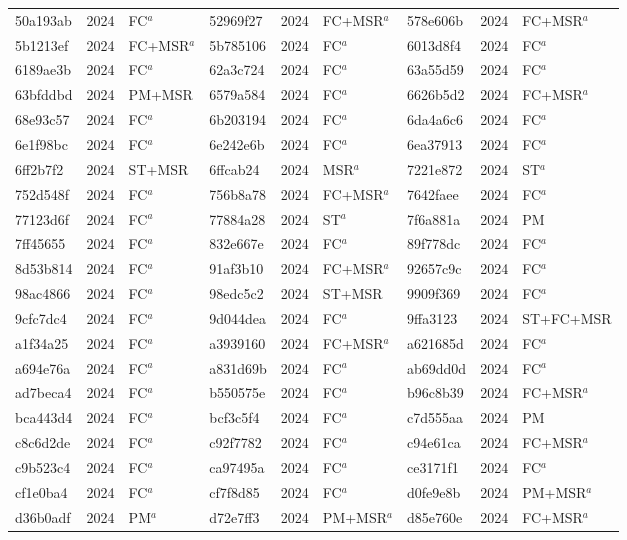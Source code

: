 \begin{longtable}{lll@{\hspace{10pt}}lll@{\hspace{10pt}}lll}
50a193ab & 2024 & FC$^{a}$ & 52969f27 & 2024 & FC+MSR$^{a}$ & 578e606b & 2024 & FC+MSR$^{a}$ \\
5b1213ef & 2024 & FC+MSR$^{a}$ & 5b785106 & 2024 & FC$^{a}$ & 6013d8f4 & 2024 & FC$^{a}$ \\
6189ae3b & 2024 & FC$^{a}$ & 62a3c724 & 2024 & FC$^{a}$ & 63a55d59 & 2024 & FC$^{a}$ \\
63bfddbd & 2024 & PM+MSR & 6579a584 & 2024 & FC$^{a}$ & 6626b5d2 & 2024 & FC+MSR$^{a}$ \\
68e93c57 & 2024 & FC$^{a}$ & 6b203194 & 2024 & FC$^{a}$ & 6da4a6c6 & 2024 & FC$^{a}$ \\
6e1f98bc & 2024 & FC$^{a}$ & 6e242e6b & 2024 & FC$^{a}$ & 6ea37913 & 2024 & FC$^{a}$ \\
6ff2b7f2 & 2024 & ST+MSR & 6ffcab24 & 2024 & MSR$^{a}$ & 7221e872 & 2024 & ST$^{a}$ \\
752d548f & 2024 & FC$^{a}$ & 756b8a78 & 2024 & FC+MSR$^{a}$ & 7642faee & 2024 & FC$^{a}$ \\
77123d6f & 2024 & FC$^{a}$ & 77884a28 & 2024 & ST$^{a}$ & 7f6a881a & 2024 & PM \\
7ff45655 & 2024 & FC$^{a}$ & 832e667e & 2024 & FC$^{a}$ & 89f778dc & 2024 & FC$^{a}$ \\
8d53b814 & 2024 & FC$^{a}$ & 91af3b10 & 2024 & FC+MSR$^{a}$ & 92657c9c & 2024 & FC$^{a}$ \\
98ac4866 & 2024 & FC$^{a}$ & 98edc5c2 & 2024 & ST+MSR & 9909f369 & 2024 & FC$^{a}$ \\
9cfc7dc4 & 2024 & FC$^{a}$ & 9d044dea & 2024 & FC$^{a}$ & 9ffa3123 & 2024 & ST+FC+MSR \\
a1f34a25 & 2024 & FC$^{a}$ & a3939160 & 2024 & FC+MSR$^{a}$ & a621685d & 2024 & FC$^{a}$ \\
a694e76a & 2024 & FC$^{a}$ & a831d69b & 2024 & FC$^{a}$ & ab69dd0d & 2024 & FC$^{a}$ \\
ad7beca4 & 2024 & FC$^{a}$ & b550575e & 2024 & FC$^{a}$ & b96c8b39 & 2024 & FC+MSR$^{a}$ \\
bca443d4 & 2024 & FC$^{a}$ & bcf3c5f4 & 2024 & FC$^{a}$ & c7d555aa & 2024 & PM \\
c8c6d2de & 2024 & FC$^{a}$ & c92f7782 & 2024 & FC$^{a}$ & c94e61ca & 2024 & FC+MSR$^{a}$ \\
c9b523c4 & 2024 & FC$^{a}$ & ca97495a & 2024 & FC$^{a}$ & ce3171f1 & 2024 & FC$^{a}$ \\
cf1e0ba4 & 2024 & FC$^{a}$ & cf7f8d85 & 2024 & FC$^{a}$ & d0fe9e8b & 2024 & PM+MSR$^{a}$ \\
d36b0adf & 2024 & PM$^{a}$ & d72e7ff3 & 2024 & PM+MSR$^{a}$ & d85e760e & 2024 & FC+MSR$^{a}$ \\

\end{longtable}
